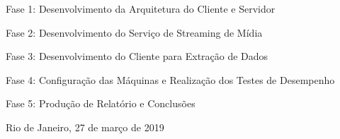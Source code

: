 \documentclass[a4paper,12pt]{article}
\begin{document}
Fase 1: Desenvolvimento da Arquitetura do Cliente e Servidor

Fase 2: Desenvolvimento do Serviço de Streaming de Mídia

Fase 3: Desenvolvimento do Cliente para Extração de Dados

Fase 4: Configuração das Máquinas e Realização dos Testes de Desempenho

Fase 5: Produção de Relatório e Conclusões





\vspace{2cm}
\noindent
Rio de Janeiro, 27 de março de 2019

\vspace{1cm}
\begin{flushright}
      \parbox{10cm}{
            \hrulefill

            \vspace{-.375cm}

            \vspace{0.9cm}
            \hrulefill

            \vspace{-.375cm}
 
            \vspace{0.9cm}
      }
\end{flushright}
\vfill
      
\end{document}
